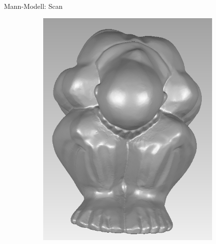 \documentclass[11pt]{beamer}
\begin{document}
\begin{frame}{Mann-Modell: Scan}
	\begin{figure}
		\begin{subfigure}{0.4\textwidth}
			\includegraphics[width=\textwidth]{images/Mann_Front}
		\end{subfigure}
		\begin{subfigure}{0.4\textwidth}

\end{subfigure}
\end{figure}
\end{frame}
\end{document}
